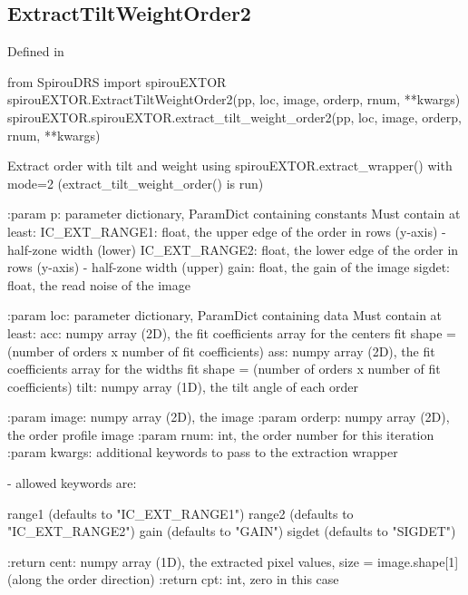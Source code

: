 
\begin{minipage}{\textwidth}
\subsection{ExtractTiltWeightOrder2}

Defined in \spirouEXTOR{}

\begin{pythonbox}
from SpirouDRS import spirouEXTOR
spirouEXTOR.ExtractTiltWeightOrder2(pp, loc, image, orderp, rnum, **kwargs)
spirouEXTOR.spirouEXTOR.extract_tilt_weight_order2(pp, loc, image, orderp, rnum, **kwargs)
\end{pythonbox}

\begin{pythondocstring}
Extract order with tilt and weight using
spirouEXTOR.extract_wrapper() with mode=2
(extract_tilt_weight_order() is run)

:param p: parameter dictionary, ParamDict containing constants
    Must contain at least:
            IC_EXT_RANGE1: float, the upper edge of the order in rows
                           (y-axis) - half-zone width (lower)
            IC_EXT_RANGE2: float, the lower edge of the order in rows
                           (y-axis) - half-zone width (upper)
            gain: float, the gain of the image
            sigdet: float, the read noise of the image

:param loc: parameter dictionary, ParamDict containing data
        Must contain at least:
            acc: numpy array (2D), the fit coefficients array for
                  the centers fit
                  shape = (number of orders x number of fit coefficients)
            ass: numpy array (2D), the fit coefficients array for
                  the widths fit
                  shape = (number of orders x number of fit coefficients)
            tilt: numpy array (1D), the tilt angle of each order

:param image: numpy array (2D), the image
:param orderp: numpy array (2D), the order profile image
:param rnum: int, the order number for this iteration
:param kwargs: additional keywords to pass to the extraction wrapper

        - allowed keywords are:

        range1  (defaults to "IC_EXT_RANGE1")
        range2  (defaults to "IC_EXT_RANGE2")
        gain    (defaults to "GAIN")
        sigdet  (defaults to "SIGDET")

:return cent: numpy array (1D), the extracted pixel values,
             size = image.shape[1] (along the order direction)
:return cpt: int, zero in this case
\end{pythondocstring}
\end{minipage}


